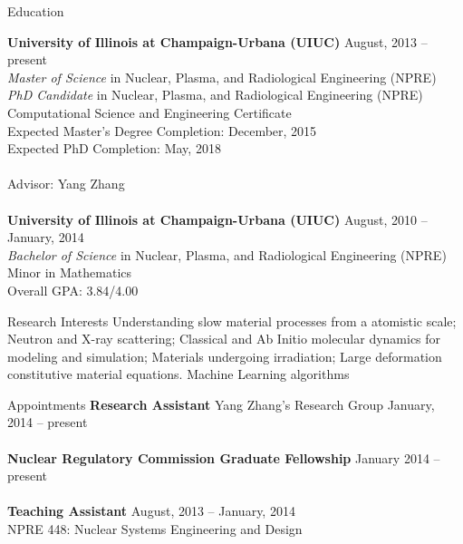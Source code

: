 \documentclass{resume} %
\begin{document}

\begin{rSection}{Education}

{\bf University of Illinois at Champaign-Urbana (UIUC)} \hfill {August, 2013 -- present} \\
{\it{Master of Science}} in Nuclear, Plasma, and Radiological Engineering (NPRE) \\
{\it{PhD Candidate}} in Nuclear, Plasma, and Radiological Engineering (NPRE) \\
Computational Science and Engineering Certificate \\
Expected Master's Degree Completion: December, 2015 \\
Expected PhD Completion: May, 2018\\
\\
Advisor: Yang Zhang
\\
\\
{\bf University of Illinois at Champaign-Urbana (UIUC)} \hfill { August, 2010 -- January, 2014} \\ 
{\it Bachelor of Science} in Nuclear, Plasma, and Radiological Engineering (NPRE) \\
Minor in Mathematics \\
Overall GPA: 3.84/4.00
\smallskip \\


\end{rSection}

\begin{rSection}{Research Interests}
	Understanding slow material processes from a atomistic scale; Neutron and X-ray scattering; Classical and Ab Initio molecular dynamics for modeling and simulation; Materials undergoing irradiation; Large deformation constitutive material equations. Machine Learning algorithms
	\\
\end{rSection}


\begin{rSection}{Appointments}
	{\bf Research Assistant} Yang Zhang's Research Group \hfill {January, 2014 -- present} 
	\\
	\\
	{\bf Nuclear Regulatory Commission Graduate Fellowship} \hfill {January 2014 -- present}
	\\
	\\
	{\bf Teaching Assistant} \hfill {August, 2013 -- January, 2014} \\
	NPRE 448: Nuclear Systems Engineering and Design
	\\
\end{rSection}
\end{document}
